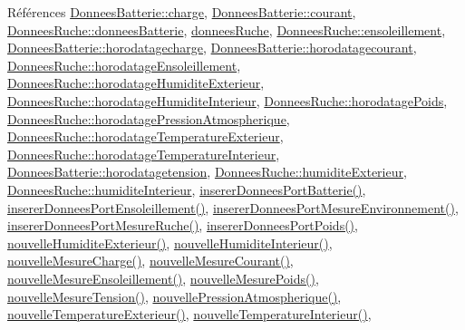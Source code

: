 Références \hyperlink{struct_donnees_batterie_a4d3cf76cf1722835a6449bc4a29e761b}{Donnees\+Batterie\+::charge}, \hyperlink{struct_donnees_batterie_a7a996ea5eacd6839a8a34dbbe48eb59a}{Donnees\+Batterie\+::courant}, \hyperlink{struct_donnees_ruche_a67dc57b9568529e595a5a31e93eef703}{Donnees\+Ruche\+::donnees\+Batterie}, \hyperlink{class_ruche_a1526bfa78f03e0710ad16f880a40c15f}{donnees\+Ruche}, \hyperlink{struct_donnees_ruche_adfa6aee15b2a96b968e558ac14e0f2de}{Donnees\+Ruche\+::ensoleillement}, \hyperlink{struct_donnees_batterie_a98859495d938a84f1c6aa818e0d31e82}{Donnees\+Batterie\+::horodatagecharge}, \hyperlink{struct_donnees_batterie_a1318c296d4e6926304851a7cef0ad957}{Donnees\+Batterie\+::horodatagecourant}, \hyperlink{struct_donnees_ruche_ae1b5a2502017455f8fbd95bdab935fd1}{Donnees\+Ruche\+::horodatage\+Ensoleillement}, \hyperlink{struct_donnees_ruche_af38a9a06e2f620850ba2d152f189f67b}{Donnees\+Ruche\+::horodatage\+Humidite\+Exterieur}, \hyperlink{struct_donnees_ruche_a15ebda778958380edd4acff5d6eef5b8}{Donnees\+Ruche\+::horodatage\+Humidite\+Interieur}, \hyperlink{struct_donnees_ruche_a8f96978c53a79f3c4b450240c67a306d}{Donnees\+Ruche\+::horodatage\+Poids}, \hyperlink{struct_donnees_ruche_a21b7eeed18bc28b9c0f19f1ed5da7916}{Donnees\+Ruche\+::horodatage\+Pression\+Atmospherique}, \hyperlink{struct_donnees_ruche_a91fb0ab596625f4c63fed764dc649dfb}{Donnees\+Ruche\+::horodatage\+Temperature\+Exterieur}, \hyperlink{struct_donnees_ruche_a004c7a2447bbcdd2ba212ba2f9866dcd}{Donnees\+Ruche\+::horodatage\+Temperature\+Interieur}, \hyperlink{struct_donnees_batterie_ac19dd5bb96d677e228ddd22159076d26}{Donnees\+Batterie\+::horodatagetension}, \hyperlink{struct_donnees_ruche_ad97156720e4e08cd7aa545cdb8f3822f}{Donnees\+Ruche\+::humidite\+Exterieur}, \hyperlink{struct_donnees_ruche_a2541ee93816a11da7367b36d4bedc77b}{Donnees\+Ruche\+::humidite\+Interieur}, \hyperlink{class_ruche_a509367d6b2bcb7e6431fc1cc5ff606b5}{inserer\+Donnees\+Port\+Batterie()}, \hyperlink{class_ruche_ad21de5f7d48195be0658f52c55f34183}{inserer\+Donnees\+Port\+Ensoleillement()}, \hyperlink{class_ruche_a46c0f440f40a5125f2d579b481660457}{inserer\+Donnees\+Port\+Mesure\+Environnement()}, \hyperlink{class_ruche_aa61f6dd8b15e5242ef3a3bdd87cca4a3}{inserer\+Donnees\+Port\+Mesure\+Ruche()}, \hyperlink{class_ruche_a923f42fc4878a01f6102966a748e8f37}{inserer\+Donnees\+Port\+Poids()}, \hyperlink{class_ruche_af88c6ed0320bfe45d5b15faa936caf4d}{nouvelle\+Humidite\+Exterieur()}, \hyperlink{class_ruche_a1d5094246e935d8ae5b9f08c9d042247}{nouvelle\+Humidite\+Interieur()}, \hyperlink{class_ruche_a49ac0c627ecac39c969403db1495711f}{nouvelle\+Mesure\+Charge()}, \hyperlink{class_ruche_a46d8191444302b02a52d1128c5650730}{nouvelle\+Mesure\+Courant()}, \hyperlink{class_ruche_aa9eaf4dd1b60e525c7d1bb5319130ce1}{nouvelle\+Mesure\+Ensoleillement()}, \hyperlink{class_ruche_abe5e5d4f4070766d5295d4dc6e0ce03c}{nouvelle\+Mesure\+Poids()}, \hyperlink{class_ruche_aa3fd352b343fcf780787aeb7e42935ef}{nouvelle\+Mesure\+Tension()}, \hyperlink{class_ruche_ae72c86953df530bc5d3901ba66cf884d}{nouvelle\+Pression\+Atmospherique()}, \hyperlink{class_ruche_aa8d28f554cd485c32d348a9147d2e236}{nouvelle\+Temperature\+Exterieur()}, \hyperlink{class_ruche_ac4d6e0c0db4b5c992606bff88759b2c3}{nouvelle\+Temperature\+Interieur()}, 